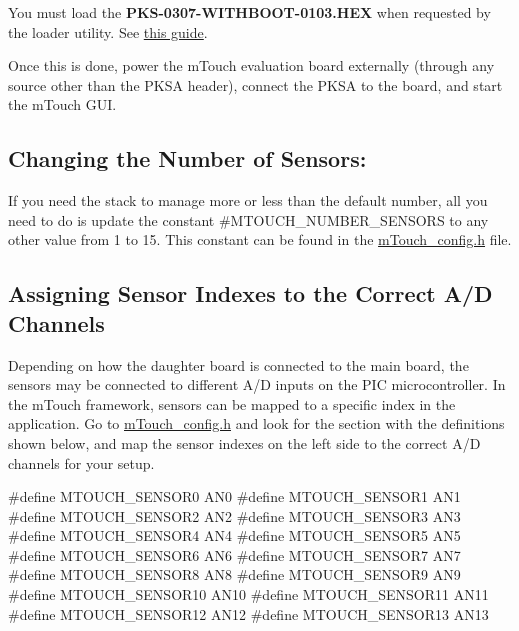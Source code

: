You must load the {\bfseries P\+K\+S-\/0307-\/\+W\+I\+T\+H\+B\+O\+O\+T-\/0103.\+H\+E\+X} when requested by the loader utility. See \hyperlink{PKSARS232}{this guide}.

Once this is done, power the m\+Touch evaluation board externally (through any source other than the P\+K\+S\+A header), connect the P\+K\+S\+A to the board, and start the m\+Touch G\+U\+I.\hypertarget{_getting_started_eval_GSE_CNS}{}\subsection{Changing the Number of Sensors\+:}\label{_getting_started_eval_GSE_CNS}
If you need the stack to manage more or less than the default number, all you need to do is update the constant \#\+M\+T\+O\+U\+C\+H\+\_\+\+N\+U\+M\+B\+E\+R\+\_\+\+S\+E\+N\+S\+O\+R\+S to any other value from 1 to 15. This constant can be found in the \hyperlink{m_touch__config_8h}{m\+Touch\+\_\+config.\+h} file.\hypertarget{_getting_started_eval_GSE_ASI}{}\subsection{Assigning Sensor Indexes to the Correct A/\+D Channels}\label{_getting_started_eval_GSE_ASI}
Depending on how the daughter board is connected to the main board, the sensors may be connected to different A/\+D inputs on the P\+I\+C microcontroller. In the m\+Touch framework, sensors can be mapped to a specific index in the application. Go to \hyperlink{m_touch__config_8h}{m\+Touch\+\_\+config.\+h} and look for the section with the definitions shown below, and map the sensor indexes on the left side to the correct A/\+D channels for your setup. 
\begin{DoxyCode}
\textcolor{preprocessor}{#define MTOUCH\_SENSOR0             AN0  }
\textcolor{preprocessor}{#define MTOUCH\_SENSOR1             AN1    }
\textcolor{preprocessor}{#define MTOUCH\_SENSOR2             AN2     }
\textcolor{preprocessor}{#define MTOUCH\_SENSOR3             AN3     }
\textcolor{preprocessor}{#define MTOUCH\_SENSOR4             AN4     }
\textcolor{preprocessor}{#define MTOUCH\_SENSOR5             AN5     }
\textcolor{preprocessor}{#define MTOUCH\_SENSOR6             AN6     }
\textcolor{preprocessor}{#define MTOUCH\_SENSOR7             AN7     }
\textcolor{preprocessor}{#define MTOUCH\_SENSOR8             AN8     }
\textcolor{preprocessor}{#define MTOUCH\_SENSOR9             AN9     }
\textcolor{preprocessor}{#define MTOUCH\_SENSOR10            AN10    }
\textcolor{preprocessor}{#define MTOUCH\_SENSOR11            AN11    }
\textcolor{preprocessor}{#define MTOUCH\_SENSOR12            AN12    }
\textcolor{preprocessor}{#define MTOUCH\_SENSOR13            AN13}
\end{DoxyCode}
